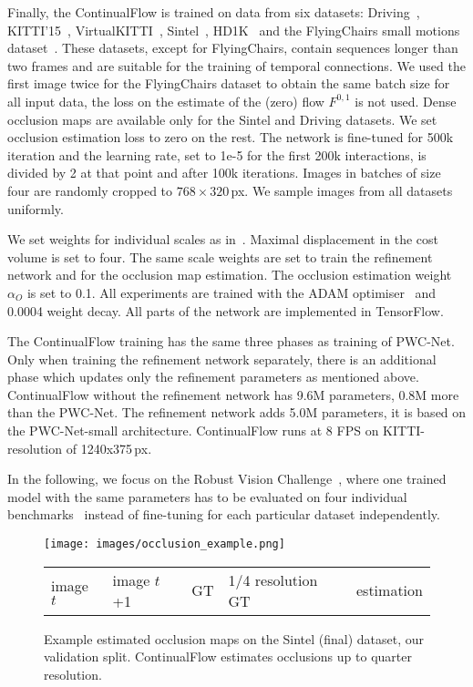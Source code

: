 \documentclass[runningheads]{llncs}
\begin{document}
Finally, the ContinualFlow is trained on data from six datasets: Driving~\cite{Mayer2016}, KITTI'15~\cite{Menze2015}, VirtualKITTI~\cite{Gaidon2016}, Sintel~\cite{Butler2012}, HD1K~\cite{Kondermann2016} and the FlyingChairs small motions dataset~\cite{Ilg2016}. 
These datasets, except for FlyingChairs, contain sequences longer than two frames and are suitable for the training of temporal connections.
We used the first image twice for the FlyingChairs dataset to obtain the same batch size for all input data, the loss on the estimate of the (zero) flow $F^{0,1}$ is not used.
Dense occlusion maps are available only for the Sintel and Driving datasets. We set occlusion estimation loss to zero on the rest.
The network is fine-tuned for 500k iteration and the learning rate, set to 1e-5 for the first 200k interactions, is divided by 2 at that point and after 100k iterations.
Images in batches of size four are randomly cropped to $768\times 320$\,px.
We sample images from all datasets uniformly.

We set weights for individual scales as in~\cite{Sun2017}.
Maximal displacement in the cost volume is set to four.
The same scale weights are set to train the refinement network and for the occlusion map estimation. The occlusion estimation weight $\alpha_{O}$ is set to 0.1. 
All experiments are trained with the ADAM optimiser~\cite{Kingma2014} and 0.0004 weight decay.
All parts of the network are implemented in TensorFlow.

The ContinualFlow training has the same three phases as training of PWC-Net.
Only when training the refinement network separately, there is an additional phase which updates only the refinement parameters as mentioned above.
ContinualFlow without the refinement network has 9.6M parameters, 0.8M more than the PWC-Net.
The refinement network adds 5.0M parameters, it is based on the PWC-Net-small architecture.
ContinualFlow runs at 8 FPS on KITTI-resolution of 1240x375\,px.

In the following, we focus on the Robust Vision Challenge~\cite{RVC2018}, where one trained model with the same parameters has to be evaluated on four individual benchmarks~\cite{Menze2015,Butler2012,Kondermann2016,Baker2011} instead of fine-tuning for each particular dataset independently.

\begin{figure*}[t]
\centering
\texttt{[image: images/occlusion\_example.png]}
\vspace{-1em}
\begin{tabular}{C{.192\linewidth}C{.192\linewidth}C{.192\linewidth}C{.192\linewidth}C{.192\linewidth}}
\scriptsize image $t$ & \scriptsize image $t$+1 & \scriptsize GT & \scriptsize 1/4 resolution GT & \scriptsize estimation
\end{tabular}
\caption{Example estimated occlusion maps on the Sintel (final) dataset, our validation split. ContinualFlow estimates occlusions up to quarter resolution.\vspace*{-2ex}}
\label{fig:occl_sintel}
\end{figure*}
\end{document}
